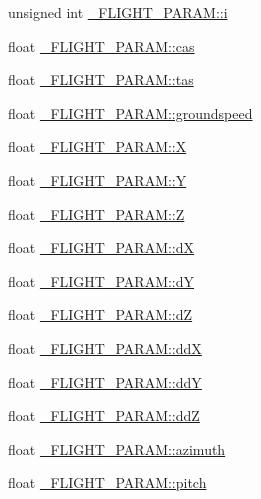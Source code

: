 \begin{DoxyCompactItemize}
\item 
unsigned int \hyperlink{group___h_i_t_l_plugin_gafd95bf6c88f8e93baff6c5e27a5508a4}{\-\_\-\-F\-L\-I\-G\-H\-T\-\_\-\-P\-A\-R\-A\-M\-::i}
\item 
float \hyperlink{group___h_i_t_l_plugin_ga2fbe36224e421144a3822791ccd78c7b}{\-\_\-\-F\-L\-I\-G\-H\-T\-\_\-\-P\-A\-R\-A\-M\-::cas}
\item 
float \hyperlink{group___h_i_t_l_plugin_gad3fafd24c05ec4da9b2b230dfe6eec23}{\-\_\-\-F\-L\-I\-G\-H\-T\-\_\-\-P\-A\-R\-A\-M\-::tas}
\item 
float \hyperlink{group___h_i_t_l_plugin_ga2a4535a23a5ca83f655298d2494556d5}{\-\_\-\-F\-L\-I\-G\-H\-T\-\_\-\-P\-A\-R\-A\-M\-::groundspeed}
\item 
float \hyperlink{group___h_i_t_l_plugin_ga55a42deedc5785d55c570ae908bcc46a}{\-\_\-\-F\-L\-I\-G\-H\-T\-\_\-\-P\-A\-R\-A\-M\-::\-X}
\item 
float \hyperlink{group___h_i_t_l_plugin_gafb4f835313c27ac7b01fe3eb77b6bacc}{\-\_\-\-F\-L\-I\-G\-H\-T\-\_\-\-P\-A\-R\-A\-M\-::\-Y}
\item 
float \hyperlink{group___h_i_t_l_plugin_gacb21381efc860b328d0be136ef53f98c}{\-\_\-\-F\-L\-I\-G\-H\-T\-\_\-\-P\-A\-R\-A\-M\-::\-Z}
\item 
float \hyperlink{group___h_i_t_l_plugin_gaa09582d7507d6bc84817aad1828e79a6}{\-\_\-\-F\-L\-I\-G\-H\-T\-\_\-\-P\-A\-R\-A\-M\-::d\-X}
\item 
float \hyperlink{group___h_i_t_l_plugin_ga759dc6a87e18b4ee9e44c2ab66ba767f}{\-\_\-\-F\-L\-I\-G\-H\-T\-\_\-\-P\-A\-R\-A\-M\-::d\-Y}
\item 
float \hyperlink{group___h_i_t_l_plugin_gade2afe2cbfb8e8fe0f8d7d97e0e62076}{\-\_\-\-F\-L\-I\-G\-H\-T\-\_\-\-P\-A\-R\-A\-M\-::d\-Z}
\item 
float \hyperlink{group___h_i_t_l_plugin_gabb56dcac3d6e652f79e4a2fd79322e66}{\-\_\-\-F\-L\-I\-G\-H\-T\-\_\-\-P\-A\-R\-A\-M\-::dd\-X}
\item 
float \hyperlink{group___h_i_t_l_plugin_ga076f6e2f6b3ce2a8f01d26b3a7dac1bd}{\-\_\-\-F\-L\-I\-G\-H\-T\-\_\-\-P\-A\-R\-A\-M\-::dd\-Y}
\item 
float \hyperlink{group___h_i_t_l_plugin_ga7961abcc14db01ab5ba42c426e2160c5}{\-\_\-\-F\-L\-I\-G\-H\-T\-\_\-\-P\-A\-R\-A\-M\-::dd\-Z}
\item 
float \hyperlink{group___h_i_t_l_plugin_ga849192344fdd21a6a53e00920b89bbdc}{\-\_\-\-F\-L\-I\-G\-H\-T\-\_\-\-P\-A\-R\-A\-M\-::azimuth}
\item 
float \hyperlink{group___h_i_t_l_plugin_gaff7712b3622dba7f5178549057fdac4e}{\-\_\-\-F\-L\-I\-G\-H\-T\-\_\-\-P\-A\-R\-A\-M\-::pitch}

\end{DoxyCompactItemize}
